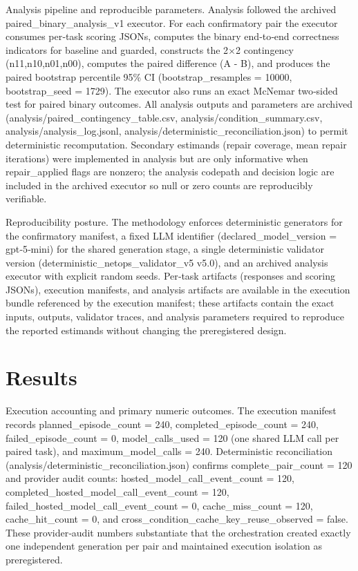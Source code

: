 \documentclass[conference]{IEEEtran}
\begin{document}
Analysis pipeline and reproducible parameters. Analysis followed the archived paired\_binary\_analysis\_v1 executor. For each confirmatory pair the executor consumes per‑task scoring JSONs, computes the binary end‑to‑end correctness indicators for baseline and guarded, constructs the 2\ensuremath{\times}2 contingency (n11,n10,n01,n00), computes the paired difference (A - B), and produces the paired bootstrap percentile 95\% CI (bootstrap\_resamples = 10000, bootstrap\_seed = 1729). The executor also runs an exact McNemar two‑sided test for paired binary outcomes. All analysis outputs and parameters are archived (analysis/paired\_contingency\_table.csv, analysis/condition\_summary.csv, analysis/analysis\_log.jsonl, analysis/deterministic\_reconciliation.json) to permit deterministic recomputation. Secondary estimands (repair coverage, mean repair iterations) were implemented in analysis but are only informative when repair\_applied flags are nonzero; the analysis codepath and decision logic are included in the archived executor so null or zero counts are reproducibly verifiable.

Reproducibility posture. The methodology enforces deterministic generators for the confirmatory manifest, a fixed LLM identifier (declared\_model\_version = gpt‑5‑mini) for the shared generation stage, a single deterministic validator version (deterministic\_netops\_validator\_v5 v5.0), and an archived analysis executor with explicit random seeds. Per‑task artifacts (responses and scoring JSONs), execution manifests, and analysis artifacts are available in the execution bundle referenced by the execution manifest; these artifacts contain the exact inputs, outputs, validator traces, and analysis parameters required to reproduce the reported estimands without changing the preregistered design.

\section{Results}
Execution accounting and primary numeric outcomes. The execution manifest records planned\_episode\_count = 240, completed\_episode\_count = 240, failed\_episode\_count = 0, model\_calls\_used = 120 (one shared LLM call per paired task), and maximum\_model\_calls = 240. Deterministic reconciliation (analysis/deterministic\_reconciliation.json) confirms complete\_pair\_count = 120 and provider audit counts: hosted\_model\_call\_event\_count = 120, completed\_hosted\_model\_call\_event\_count = 120, failed\_hosted\_model\_call\_event\_count = 0, cache\_miss\_count = 120, cache\_hit\_count = 0, and cross\_condition\_cache\_key\_reuse\_observed = false. These provider‑audit numbers substantiate that the orchestration created exactly one independent generation per pair and maintained execution isolation as preregistered.
\end{document}
